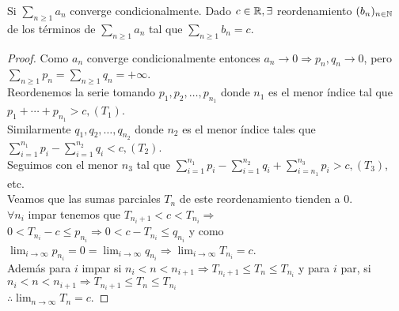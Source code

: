 \begin{theorem}
  Si \(\sum_{n \geq 1} a_n\) converge condicionalmente. Dado \(c \in \mathbb{R}, \exists \) reordenamiento \((b_n)_{n \in \mathbb{N}} \) de los términos de \(\sum_{n \geq 1} a_n\) tal que \(\sum_{n \geq 1} b_n = c\).
  \begin{proof}
    Como \(a_n\) converge condicionalmente entonces \(a_n \to 0 \Rightarrow p_n, q_n \to 0\), pero \(\sum_{n \geq 1} p_n = \sum_{n \geq 1} q_n = +\infty\). \\
    Reordenemos la serie tomando \(p_1, p_2, \ldots, p_{n_1} \) donde \(n_1\) es el menor índice tal que \(p_1 + \cdots + p_{n_1} > c, (T_1)\). \\
    Similarmente \(q_1, q_2, \ldots, q_{n_2} \) donde \(n_2\) es el menor índice tales que \(\sum_{i = 1}^{n_1} p_i - \sum_{i = 1}^{n_2} q_i < c, (T_2)\). \\
    Seguimos con el menor \(n_3\) tal que \(\sum_{i = 1}^{n_1} p_i - \sum_{i = 1}^{n_2} q_i + \sum_{i = n_1}^{n_3} p_i > c, (T_3)\), etc. \\
    Veamos que las sumas parciales \(T_n\) de este reordenamiento tienden a 0. \\
    \(\forall n_i\) impar tenemos que \(T_{n_i +1} < c < T_{n_i} \Rightarrow \) \\
    \(0 < T_{n_i} - c \leq p_{n_i} \Rightarrow 0 < c - T_{n_i} \leq q_{n_i} \) y como \(\lim_{i \to \infty} p_{n_i} = 0 = \lim_{i \to \infty} q_{n_i} \Rightarrow \lim_{i \to \infty} T_{n_i} = c\). \\
    Además para \(i\) impar si \(n_i < n < n_{i+1} \Rightarrow T_{n_i+1} \leq T_n \leq T_{n_i} \) y para \(i\) par, si \(n_i < n < n_{i+1} \Rightarrow T_{n_i+1} \leq T_n \leq T_{n_i} \) \\
    \(\therefore \lim_{n \to \infty} T_n = c\).
  \end{proof}
\end{theorem}
